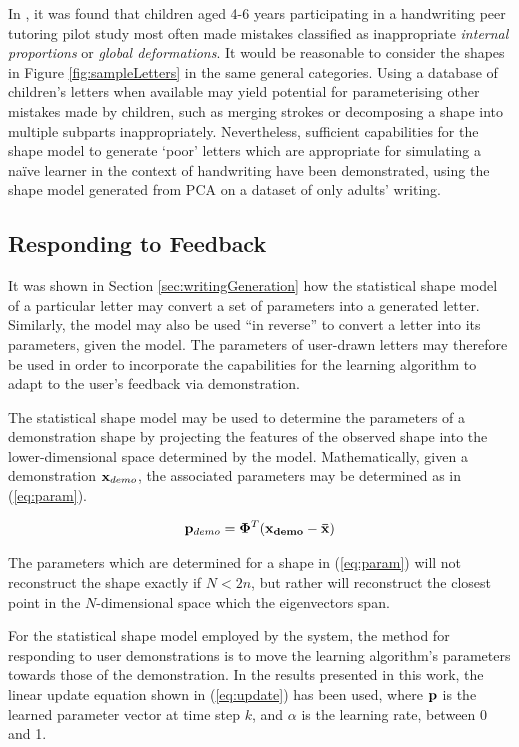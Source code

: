 \documentclass{sig-alternate}
\begin{document}
In \cite{Chandra2013}, it was found that children aged 4-6 years participating
in a handwriting peer tutoring pilot study most often made mistakes classified
as inappropriate \emph{internal proportions} or \emph{global deformations}. It
would be reasonable to consider the shapes in Figure \ref{fig:sampleLetters} in
the same general categories. Using a database of children's letters when
available may yield potential for parameterising other mistakes made by
children, such as merging strokes or decomposing a shape into multiple subparts
inappropriately. Nevertheless, sufficient capabilities for the shape model to
generate `poor' letters which are appropriate for simulating a na\"ive learner
in the context of handwriting have been demonstrated, using the shape model
generated from PCA on a dataset of only adults' writing.


\subsection{Responding to Feedback}

It was shown in Section \ref{sec:writingGeneration} how the statistical shape
model of a particular letter may convert a set of parameters into a generated
letter. Similarly, the model may also be used ``in reverse'' 
to convert a
letter into its parameters, given the model. The parameters of user-drawn
letters may therefore be used in order to incorporate the capabilities for the
learning algorithm to adapt to the user's feedback via demonstration.

The statistical shape model may be used to determine the parameters of a
demonstration shape by projecting the features of the observed shape into the
lower-dimensional space determined by the model. Mathematically, given a
demonstration ${\bf x}_{demo}$, the associated parameters may be determined as in
(\ref{eq:param}).

\begin{equation}\label{eq:param}
{\bf p}_{demo} ={\bf \Phi}^T ({\bf{x}_{demo}}-\bf{\bar{x}})
\end{equation}

The parameters which are determined for a shape in (\ref{eq:param}) will not
reconstruct the shape exactly if $N<2n$, but rather will reconstruct the closest
point in the $N$-dimensional space which the eigenvectors span.

For the statistical shape model employed by the system, the method for
responding to user demonstrations is to move the learning algorithm's parameters
towards those of the demonstration. In the results presented in this work, the
linear update equation shown in (\ref{eq:update}) has been used, where ${\bf p}$ is the
learned parameter vector at time step $k$, and $\alpha$ is the learning rate,
between 0 and 1.  
\end{document}
